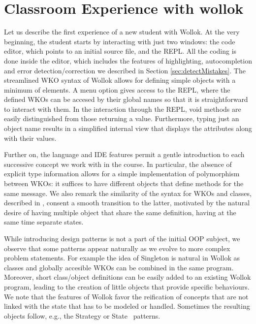 \section{Classroom Experience with wollok}
\label{sec:experience}

Let us describe the first experience of a new student with Wollok.
At the very beginning, the student starts by interacting with just two windows: the code editor, which points to an initial source file, and the REPL.
All the coding is done inside the editor, which includes the features of highlighting, autocompletion and error detection/correction we described in Section \ref{sec:detectMistakes}. The streamlined WKO syntax of Wollok allows for defining simple objects with a minimum of elements. A menu option gives access to the REPL, where the defined WKOs can be accesed by their global names so that it is straightforward to interact with them. In the interaction through the REPL, void methods are easily distinguished from those returning a value. Furthermore, typing just an object name results in a simplified internal view that displays the attributes along with their values.

Further on, the language and IDE features permit a gentle introduction to each successive concept we work with in the course. 
In particular, the absence of explicit type information allows for a simple implementation of polymorphism between WKOs: it suffices to have different objects that define methods for the same message.
We also remark the similarity of the syntax for WKOs and classes, described in , consent a smooth transition to the latter, motivated by the natural desire of having multiple object that share the same definition, having at the same time separate states.

While introducing design patterns is not a part of the initial OOP subject, we observe that some patterns appear naturally as we evolve to more complex problem statements.
For example the idea of Singleton is natural in  Wollok as classes and globally accesible WKOs can be combined in the same program. Moreover, short class/object definitions can be easily added to an existing Wollok program, leading to the creation of little objects that provide specific behaviours. We note that the features of Wollok favor the reification of concepts that are not linked with the state that has to be modeled or handled. Sometimes the resulting objects follow, e.g., the Strategy or State~\cite{Gamm93b} patterns.

